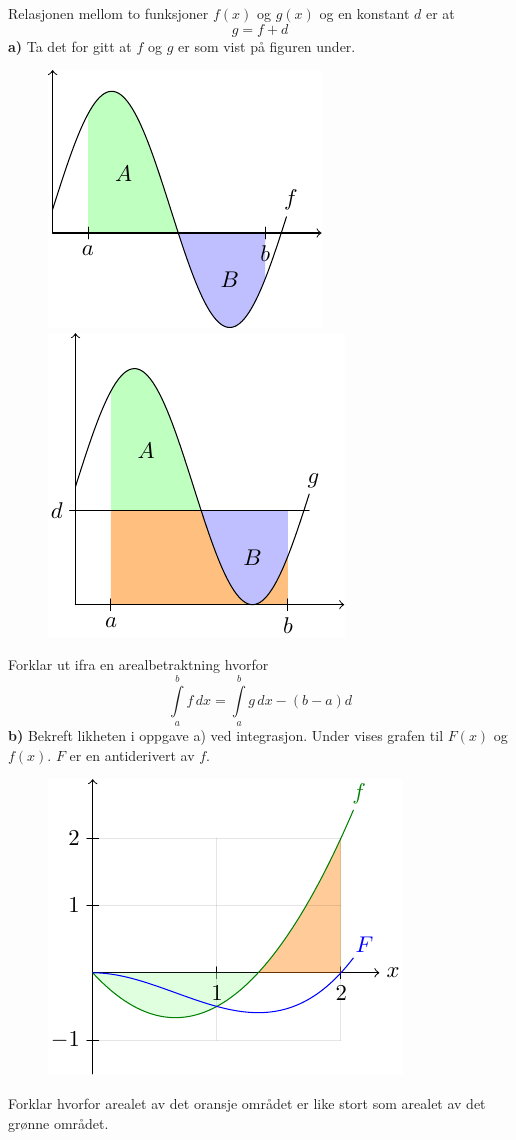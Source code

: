 \nes
{}
Relasjonen mellom to funksjoner $ f(x) $ og $ g(x) $ og en konstant $ d $ er at
\[ g=f+d \]
\textbf{a)} Ta det for gitt at $ f $ og $ g $ er som vist på figuren under.
\begin{figure}
\centering
\includegraphics[scale=0.9]{../../fig/int6a}\quad
\includegraphics[scale=0.9]{../../fig/int6b}
\end{figure}
Forklar ut ifra en arealbetraktning hvorfor\[ \int\limits_a^b f \,dx=\int\limits_a^b g\,dx -(b-a)d  \]
\textbf{b)} Bekreft likheten i oppgave a) ved integrasjon.
\newpage
{}
Under vises grafen til $ F(x) $ og $ f(x) $. $ F $ er en antiderivert av $ f $.
\begin{figure}
	\centering
	\includegraphics[scale=0.9]{../../fig/faropg}\\
	\raggedright
\end{figure}
Forklar hvorfor arealet av det oransje området er like stort som arealet av det grønne området.

